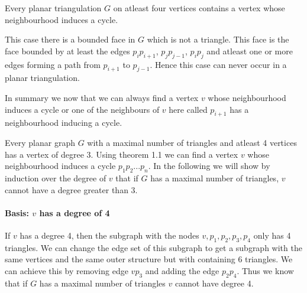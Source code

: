 \documentclass[a4paper]{article}
\begin{document}
\begin{solution}{21}
\begin{theorem}{Every planar triangulation $G$ on atleast four vertices contains a vertex whose neighbourhood induces a cycle.}
\begin{itemize}
				This case there is a bounded face in $G$ which is not a triangle. 
				This face is the face bounded by at least the edges $p_ip_{i+1}$, $p_j p_{j-1}$, $p_i p_j$ and atleast one or more edges forming a path from $p_{i+1}$ to $p_{j-1}$. 
				Hence this case can never occur in a planar triangulation. 
		\end{itemize} 
		 In summary we now that we can always find a vertex $v$ whose neighbourhood induces a cycle or one of the neighbours of $v$ here called $p_{i+1}$ has a neighbourhood inducing a cycle.  
		\end{theorem}
		
		\begin{lemma}{Every planar graph $G$ with a maximal number of triangles and atleast 4 vertices has a vertex of degree 3.}
		Using theorem 1.1 we can find a vertex $v$ whose neighbourhood induces a cycle $p_1 p_2 ... p_n$. 
		In the following we will show by induction over the degree of $v$ that if $G$ has a maximal number of triangles, $v$ cannot have a degree greater than $3$. 
		\paragraph{Basis: $v$ has a degree of 4}
		If $v$ has a degree 4, then the subgraph with the nodes $v,p_1,p_2,p_3,p_4$ only has 4 triangles.
		We can change the edge set of this subgraph to get a subgraph with the same vertices and the same outer structure but with containing 6 triangles. 
		We can achieve this by removing edge $v p_3$ and adding the edge $p_2 p_4$. 
		Thus we know that if $G$ has a maximal number of triangles $v$ cannot have degree 4. 
		\begin{center}
		\end{center}
		

\end{lemma}
\end{solution}
\end{document}
